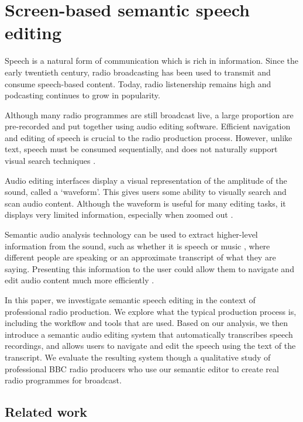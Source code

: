 \chapter{Screen-based semantic speech editing}\label{chp:screen-based}

Speech is a natural form of communication which is rich in information. Since the early twentieth century, radio
broadcasting has been used to transmit and consume speech-based content. Today, radio listenership remains high and
podcasting continues to grow in popularity. 

Although many radio programmes are still broadcast live, a large proportion are pre-recorded and put together using
audio editing software. Efficient navigation and editing of speech is crucial to the radio production process.
However, unlike text, speech must be consumed sequentially, and does not naturally support visual search techniques
\citep{Wolfe2004}. 

Audio editing interfaces display a visual representation of the amplitude of the sound, called a `waveform'. This gives
users some ability to visually search and scan audio content. Although the waveform is useful for many editing tasks,
it displays very limited information, especially when zoomed out \citep{Loviscach2011}.

Semantic audio analysis technology can be used to extract higher-level information from the sound, such as whether it
is speech or music \citep{Panagiotakis2005}, where different people are speaking \citep{AngueraMiro2012} or an
approximate transcript of what they are saying.  Presenting this information to the user could allow them to navigate
and edit audio content much more efficiently \citep{Whittaker2004}.

In this paper, we investigate semantic speech editing in the context of professional radio production. We explore what
the typical production process is, including the workflow and tools that are used. Based on our analysis, we then
introduce a semantic audio editing system that automatically transcribes speech recordings, and allows users to
navigate and edit the speech using the text of the transcript.  We evaluate the resulting system though a qualitative
study of professional BBC radio producers who use our semantic editor to create real radio programmes for broadcast.


\section{Related work}\label{sec:relatedwork}

